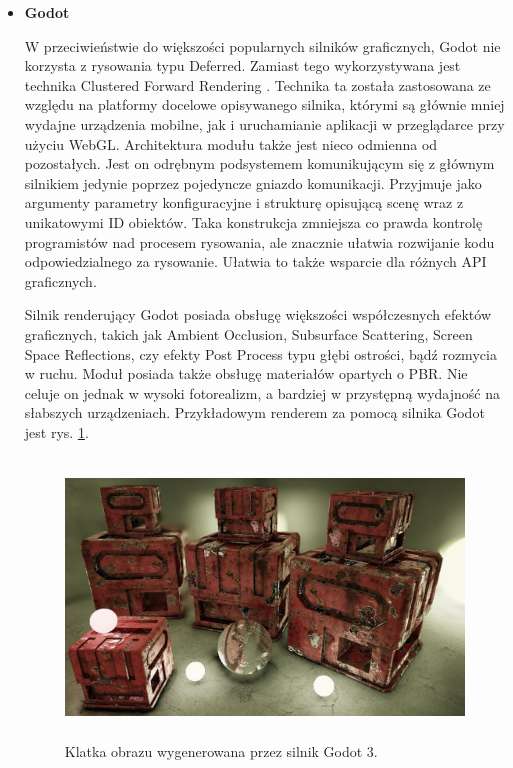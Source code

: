 \begin{itemize}
	\item \textbf{Godot}

	W przeciwieństwie do większości popularnych silników graficznych, Godot nie korzysta z rysowania typu Deferred. Zamiast tego wykorzystywana jest technika Clustered Forward Rendering \cite{godot:rendererdesign:2024}. Technika ta została zastosowana ze względu na platformy docelowe opisywanego silnika, którymi są głównie mniej wydajne urządzenia mobilne, jak i uruchamianie aplikacji w przeglądarce przy użyciu WebGL.
	Architektura modułu także jest nieco odmienna od pozostałych. Jest on odrębnym podsystemem komunikującym się z głównym silnikiem jedynie poprzez pojedyncze gniazdo komunikacji. Przyjmuje jako argumenty parametry konfiguracyjne i strukturę opisującą scenę wraz z unikatowymi ID obiektów. Taka konstrukcja zmniejsza co prawda kontrolę programistów nad procesem rysowania, ale znacznie ułatwia rozwijanie kodu odpowiedzialnego za rysowanie. Ułatwia to także wsparcie dla różnych API graficznych.

	Silnik renderujący Godot posiada obsługę większości współczesnych efektów graficznych, takich jak Ambient Occlusion, Subsurface Scattering, Screen Space Reflections, czy efekty Post Process typu głębi ostrości, bądź rozmycia w ruchu. Moduł posiada także obsługę materiałów opartych o PBR. Nie celuje on jednak w wysoki fotorealizm, a bardziej w przystępną wydajność na słabszych urządzeniach. Przykładowym renderem za pomocą silnika Godot jest rys. \ref{intro-godot}.

	\begin{figure}[htbp]
		\centering
		\includegraphics[width=4.90152in,height=2.92893in]{images/18_Godot_3_example.jpg}
		\caption{Klatka obrazu wygenerowana przez silnik Godot 3. \cite{godot:rendererdesign:2024}}
		\label{intro-godot}
	\end{figure}
\end{itemize}
